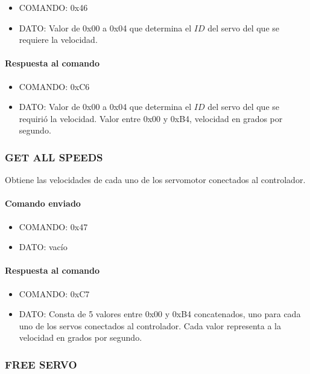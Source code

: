 \begin{itemize}
	\item{COMANDO:} 0x46
	\item{DATO:} Valor de 0x00 a 0x04 que determina el $ID$ del servo del que se requiere la velocidad.
\end{itemize}

\paragraph*{Respuesta al comando}

\begin{itemize}
	\item{COMANDO:} 0xC6
	\item{DATO:} Valor de 0x00 a 0x04 que determina el $ID$ del servo del que se requiri\'o la velocidad.
	Valor entre 0x00 y 0xB4, velocidad en grados por segundo.
\end{itemize}

\subsubsection{GET ALL SPEEDS}
\label{hA_protocolo_get_all_speeds}

Obtiene las velocidades de cada uno de los servomotor conectados al controlador.

\paragraph*{Comando enviado}

\begin{itemize}
	\item{COMANDO:} 0x47
	\item{DATO:} vac\'io
\end{itemize}

\paragraph*{Respuesta al comando}

\begin{itemize}
	\item{COMANDO:} 0xC7
	\item{DATO:} Consta de 5 valores entre 0x00 y 0xB4 concatenados, uno para cada uno de los servos conectados al controlador.
	Cada valor representa a la velocidad en grados por segundo.
\end{itemize}

\subsubsection{FREE SERVO}
\label{hA_protocolo_free_servo}

